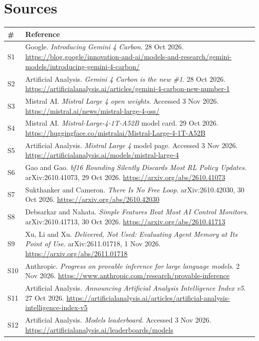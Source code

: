 \documentclass[11pt,a4paper]{article}
\begin{document}
\section{Sources}
{\footnotesize
\begin{tabularx}{\textwidth}{@{}l X@{}}
\toprule
\textbf{\#} & \textbf{Reference} \\
\midrule
S1  & Google. \emph{Introducing Gemini 4 Carbon}. 28 Oct 2026. \url{https://blog.google/innovation-and-ai/models-and-research/gemini-models/introducing-gemini-4-carbon/} \\
S2  & Artificial Analysis. \emph{Gemini 4 Carbon is the new \#1}. 28 Oct 2026. \url{https://artificialanalysis.ai/articles/gemini-4-carbon-new-number-1} \\
S3  & Mistral AI. \emph{Mistral Large 4 open weights}. Accessed 3 Nov 2026. \url{https://mistral.ai/news/mistral-large-4-oss/} \\
S4  & Mistral AI. \emph{Mistral-Large-4-1T-A52B} model card. 29 Oct 2026. \url{https://huggingface.co/mistralai/Mistral-Large-4-1T-A52B} \\
S5  & Artificial Analysis. \emph{Mistral Large 4} model page. Accessed 3 Nov 2026. \url{https://artificialanalysis.ai/models/mistral-large-4} \\
S6  & Gao and Gao. \emph{bf16 Rounding Silently Discards Most RL Policy Updates}. arXiv:2610.41073, 29 Oct 2026. \url{https://arxiv.org/abs/2610.41073} \\
S7  & Sukthanker and Cameron. \emph{There Is No Free Loop}. arXiv:2610.42030, 30 Oct 2026. \url{https://arxiv.org/abs/2610.42030} \\
S8  & Debsarkar and Nahata. \emph{Simple Features Beat Most AI Control Monitors}. arXiv:2610.41713, 30 Oct 2026. \url{https://arxiv.org/abs/2610.41713} \\
S9  & Xu, Li and Xu. \emph{Delivered, Not Used: Evaluating Agent Memory at Its Point of Use}. arXiv:2611.01718, 1 Nov 2026. \url{https://arxiv.org/abs/2611.01718} \\
S10 & Anthropic. \emph{Progress on provable inference for large language models}. 2 Nov 2026. \url{https://www.anthropic.com/research/provable-inference} \\
S11 & Artificial Analysis. \emph{Announcing Artificial Analysis Intelligence Index v5}. 27 Oct 2026. \url{https://artificialanalysis.ai/articles/artificial-analysis-intelligence-index-v5} \\
S12 & Artificial Analysis. \emph{Models leaderboard}. Accessed 3 Nov 2026. \url{https://artificialanalysis.ai/leaderboards/models} \\

\end{tabularx}}
\end{document}
